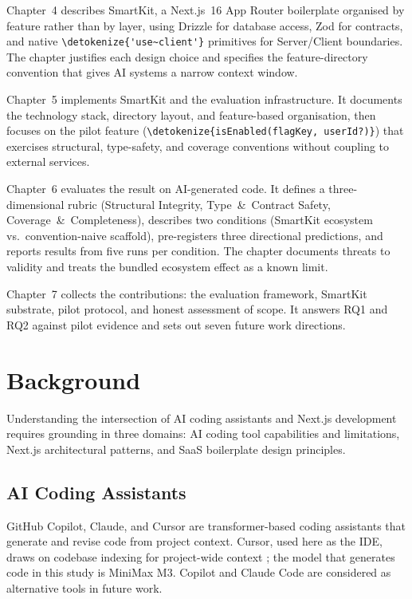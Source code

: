 \documentclass[12pt,a4paper]{report}
\newcommand{\code}[1]{\texttt{\nolinkurl{\detokenize{#1}}}}
\newcommand{\usec}{\code{'use~client'}}
\begin{document}
Chapter~4 describes SmartKit, a Next.js~16 App Router boilerplate organised by feature rather than by layer, using Drizzle for database access, Zod for contracts, and native \usec{} primitives for Server/Client boundaries. The chapter justifies each design choice and specifies the feature-directory convention that gives AI systems a narrow context window.

Chapter~5 implements SmartKit and the evaluation infrastructure. It documents the technology stack, directory layout, and feature-based organisation, then focuses on the pilot feature (\code{isEnabled(flagKey, userId?)}) that exercises structural, type-safety, and coverage conventions without coupling to external services.

Chapter~6 evaluates the result on AI-generated code. It defines a three-dimensional rubric (Structural Integrity, Type~\&~Contract Safety, Coverage~\&~Completeness), describes two conditions (SmartKit ecosystem vs.\ convention-naive scaffold), pre-registers three directional predictions, and reports results from five runs per condition. The chapter documents threats to validity and treats the bundled ecosystem effect as a known limit.

Chapter~7 collects the contributions: the evaluation framework, SmartKit substrate, pilot protocol, and honest assessment of scope. It answers RQ1 and RQ2 against pilot evidence and sets out seven future work directions.

\chapter{Background}
\label{sec:background}

Understanding the intersection of AI coding assistants and Next.js development requires grounding in three domains: AI coding tool capabilities and limitations, Next.js architectural patterns, and SaaS boilerplate design principles.

\section{AI Coding Assistants}

GitHub Copilot, Claude, and Cursor are transformer-based coding assistants that generate and revise code from project context. Cursor, used here as the IDE, draws on codebase indexing for project-wide context \parencite{cursor2024docs}; the model that generates code in this study is MiniMax M3. Copilot and Claude Code are considered as alternative tools in future work.
\end{document}
